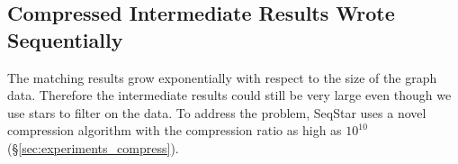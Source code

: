\subsection{Compressed Intermediate Results Wrote Sequentially}\label{sec:match_compress}
The matching results grow exponentially with respect to the size of the graph data.
Therefore the intermediate results could still be very large even though we use stars to filter on the data.
To address the problem, SeqStar uses a novel compression algorithm with the compression ratio as high as $10^{10}$ (\S\ref{sec:experiments_compress}).

